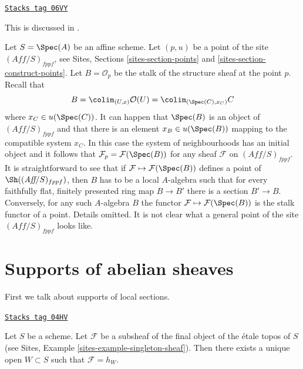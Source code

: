 \begin{remark}
\label{etale-cohomology-remark-points-fppf-site}
\href{https://stacks.math.columbia.edu/tag/06VY}{\texttt{Stacks tag 06VY}}

\begin{reference}
This is discussed in \cite{Schroeer}.
\end{reference}
Let $S = \Spec(A)$ be an affine scheme. Let $(p, u)$ be a point of
the site $(\textit{Aff}/S)_{fppf}$, see
Sites, Sections \ref{sites-section-points} and
\ref{sites-section-construct-points}. Let $B = \mathcal{O}_p$ be the stalk
of the structure sheaf at the point $p$. Recall that
$$
B = \colim_{(U, x)} \mathcal{O}(U) =
\colim_{(\Spec(C), x_C)} C
$$
where $x_C \in u(\Spec(C))$. It can happen that
$\Spec(B)$ is an object of $(\textit{Aff}/S)_{fppf}$
and that there is an element $x_B \in u(\Spec(B))$ mapping to
the compatible system $x_C$. In this case the system of neighbourhoods
has an initial object and it follows that
$\mathcal{F}_p = \mathcal{F}(\Spec(B))$ for any sheaf $\mathcal{F}$
on $(\textit{Aff}/S)_{fppf}$. It is straightforward
to see that if $\mathcal{F} \mapsto \mathcal{F}(\Spec(B))$ defines a point
of $\Sh((\textit{Aff}/S)_{fppf})$, then
$B$ has to be a local $A$-algebra such that for every faithfully flat,
finitely presented ring map $B \to B'$ there is a section $B' \to B$.
Conversely, for any such $A$-algebra $B$ the functor
$\mathcal{F} \mapsto \mathcal{F}(\Spec(B))$ is the stalk functor
of a point. Details omitted. It is not clear what a general point of the
site $(\textit{Aff}/S)_{fppf}$ looks like.
\end{remark}

\section{Supports of abelian sheaves}
\label{etale-cohomology-section-support}
First we talk about supports of local sections.

\begin{lemma}
\label{etale-cohomology-lemma-support-subsheaf-final}
\href{https://stacks.math.columbia.edu/tag/04HV}{\texttt{Stacks tag 04HV}}

Let $S$ be a scheme. Let $\mathcal{F}$ be a subsheaf of the final
object of the \'etale topos of $S$ (see
Sites, Example \ref{sites-example-singleton-sheaf}).
Then there exists a unique open
$W \subset S$ such that $\mathcal{F} = h_W$.
\end{lemma}

